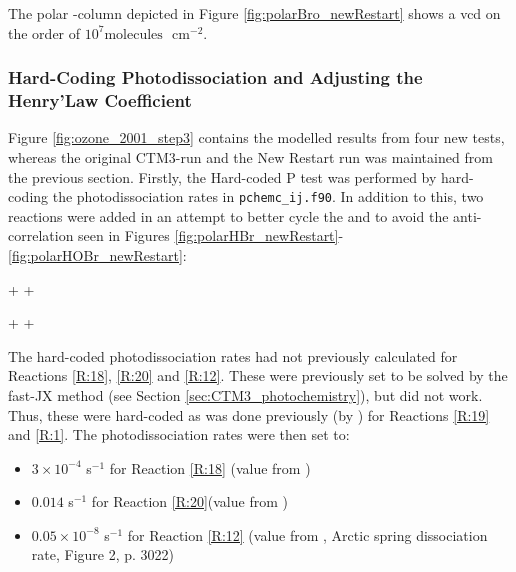 \medskip

The polar -column depicted in Figure \ref{fig:polarBro_newRestart} shows a \acrshort{vcd} on the order of $10^7 \text{molecules }$ cm$^{-2}$. 

\clearpage
\subsubsection{Hard-Coding Photodissociation and Adjusting the Henry'Law Coefficient}\label{sec:res_step3}

Figure \ref{fig:ozone_2001_step3} contains the modelled results from four new tests, whereas the original CTM3-run and the New Restart run was maintained from the previous section. Firstly, the Hard-coded P test was performed by hard-coding the photodissociation rates in \texttt{pchemc\_ij.f90}. In addition to this, two reactions were added in an attempt to better cycle the  and  to avoid the anti-correlation seen in Figures \ref{fig:polarHBr_newRestart}-\ref{fig:polarHOBr_newRestart}:  

\begin{reaction}
     +  \rightarrow {} + 
    \label{rqn:oh_br2}
\end{reaction}


\begin{reaction}
     +  \rightarrow {} + 
    \label{rqn:oh_hbr}
\end{reaction}

The hard-coded photodissociation rates had not previously calculated for Reactions \ref{R:18}, \ref{R:20} and \ref{R:12}. These were previously set to be solved by the fast-JX method (see Section \ref{sec:CTM3_photochemistry}), but did not work. Thus, these were hard-coded as was done previously (by \cite{Susanne}) for Reactions \ref{R:19} and \ref{R:1}. The photodissociation rates were then set to: 

\begin{itemize}
    \item $3\times10^{-4}$ s$^{-1}$ for Reaction \ref{R:18} (value from \cite{CAO})
    \item $0.014$ s$^{-1}$ for Reaction \ref{R:20}(value from \cite{CAO})
    \item $0.05\times10^{-8}$ s$^{-1}$ for Reaction \ref{R:12} (value from \cite{Papanastasiou2013}, Arctic spring dissociation rate, Figure 2, p. 3022)
\end{itemize}


